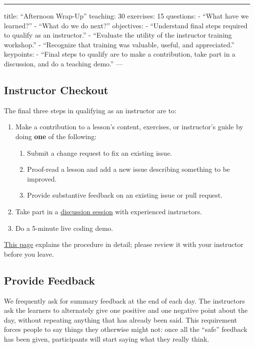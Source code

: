 \begin{center}
\rule{3in}{0.4pt}
\end{center}
title: ``Afternoon Wrap-Up''
teaching: 30
exercises: 15
questions:
- ``What have we learned?''
- ``What do we do next?''
objectives:
- ``Understand final steps required to qualify as an instructor.''
- ``Evaluate the utility of the instructor training workshop.''
- ``Recognize that training was valuable, useful, and appreciated.''
keypoints:
- ``Final steps to qualify are to make a contribution, take part in a discussion, and do a teaching demo.''
---

\subsection*{Instructor Checkout}

The final three steps in qualifying as an instructor are to:

\begin{enumerate}
\item Make a contribution to a lesson's content, exercises, or instructor's guide by doing \textbf{one} of the following:


\begin{enumerate}
\item Submit a change request to fix an existing issue.
\item Proof-read a lesson and add a new issue describing something to be improved.
\item Provide substantive feedback on an existing issue or pull request.
\end{enumerate}
\item Take part in a \href{http://pad.software-carpentry.org/instructor-discussion}{discussion session} with experienced instructors.
\item Do a 5-minute live coding demo.
\end{enumerate}

\href{\{\{ page.root \}\}/checkout/}{This page} explains the procedure in detail;
please review it with your instructor before you leave.

\subsection*{Provide Feedback}

We frequently ask for summary feedback at the end of each day.
The instructors ask the learners to alternately give one positive and one negative point about the day,
without repeating anything that has already been said.
This requirement forces people to say things they otherwise might not:
once all the ``safe'' feedback has been given,
participants will start saying what they really think.

